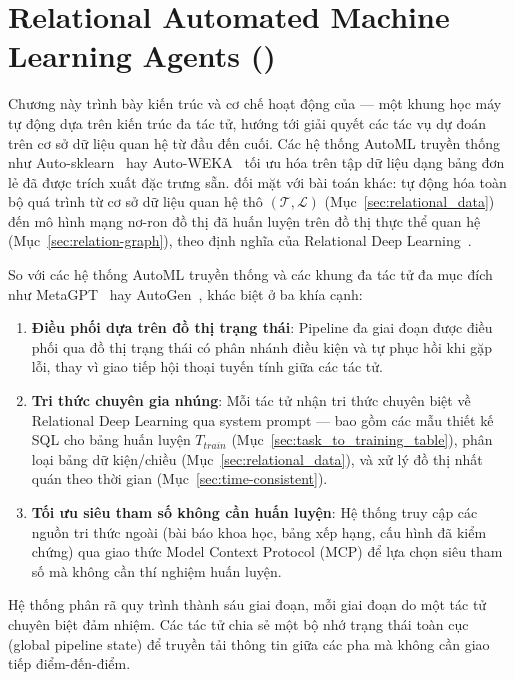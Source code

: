 \chapter{Relational Automated Machine Learning Agents (\tool)}

Chương này trình bày kiến trúc và cơ chế hoạt động của \tool --- một khung học máy tự động dựa trên kiến trúc đa tác tử, hướng tới giải quyết các tác vụ dự đoán trên cơ sở dữ liệu quan hệ từ đầu đến cuối. Các hệ thống AutoML truyền thống như Auto-sklearn~\cite{feurer2015autosklearn} hay Auto-WEKA~\cite{kotthoff2017autoweka} tối ưu hóa trên tập dữ liệu dạng bảng đơn lẻ đã được trích xuất đặc trưng sẵn. \tool đối mặt với bài toán khác: tự động hóa toàn bộ quá trình từ cơ sở dữ liệu quan hệ thô $(\mathcal{T}, \mathcal{L})$ (Mục~\ref{sec:relational_data}) đến mô hình mạng nơ-ron đồ thị đã huấn luyện trên đồ thị thực thể quan hệ (Mục~\ref{sec:relation-graph}), theo định nghĩa của Relational Deep Learning~\cite{robinson2024relbench}.

So với các hệ thống AutoML truyền thống và các khung đa tác tử đa mục đích như MetaGPT~\cite{hong2023metagpt} hay AutoGen~\cite{wu2023autogen}, \tool khác biệt ở ba khía cạnh:
\begin{enumerate}
    \item \textbf{Điều phối dựa trên đồ thị trạng thái}: Pipeline đa giai đoạn được điều phối qua đồ thị trạng thái có phân nhánh điều kiện và tự phục hồi khi gặp lỗi, thay vì giao tiếp hội thoại tuyến tính giữa các tác tử.
    \item \textbf{Tri thức chuyên gia nhúng}: Mỗi tác tử nhận tri thức chuyên biệt về Relational Deep Learning qua system prompt --- bao gồm các mẫu thiết kế SQL cho bảng huấn luyện $T_{train}$ (Mục~\ref{sec:task_to_training_table}), phân loại bảng dữ kiện/chiều (Mục~\ref{sec:relational_data}), và xử lý đồ thị nhất quán theo thời gian (Mục~\ref{sec:time-consistent}).
    \item \textbf{Tối ưu siêu tham số không cần huấn luyện}: Hệ thống truy cập các nguồn tri thức ngoài (bài báo khoa học, bảng xếp hạng, cấu hình đã kiểm chứng) qua giao thức Model Context Protocol (MCP) để lựa chọn siêu tham số mà không cần thí nghiệm huấn luyện.
\end{enumerate}

Hệ thống phân rã quy trình thành sáu giai đoạn, mỗi giai đoạn do một tác tử chuyên biệt đảm nhiệm. Các tác tử chia sẻ một bộ nhớ trạng thái toàn cục (global pipeline state) để truyền tải thông tin giữa các pha mà không cần giao tiếp điểm-đến-điểm.





